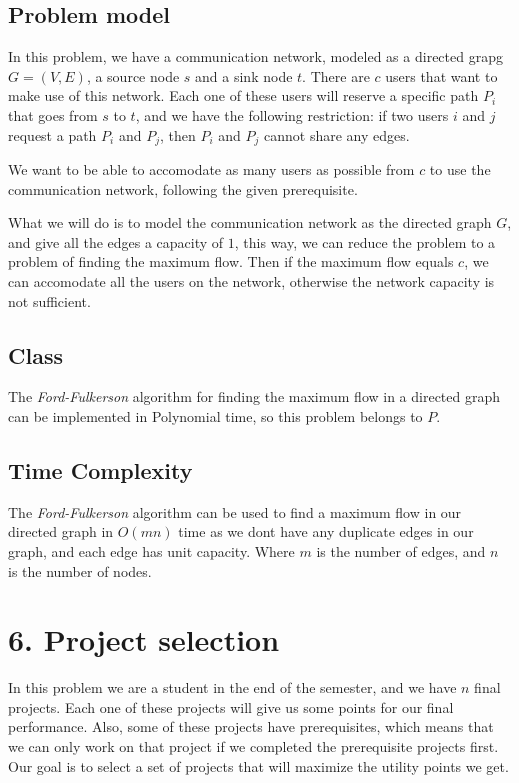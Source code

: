 \documentclass{article}
\begin{document}
\subsection*{Problem model}

In this problem, we have a communication network, modeled as a directed grapg $G = (V,E)$, a source node $s$ and a sink node $t$. There are $c$ users that want to make use of this network. Each one of these users will reserve a specific path $P_i$ that goes from $s$ to $t$, and we have the following restriction: if two users $i$ and $j$ request a path $P_i$ and $P_j$, then $P_i$ and $P_j$ cannot share any edges.

We want to be able to accomodate as many users as possible from $c$ to use the communication network, following the given prerequisite. 

What we will do is to model the communication network as the directed graph $G$, and give all the edges a capacity of $1$, this way, we can reduce the problem to a problem of finding the maximum flow. Then if the maximum flow equals $c$, we can accomodate all the users on the network, otherwise the network capacity is not sufficient.

\subsection*{Class}

The \textit{Ford-Fulkerson} algorithm for finding the maximum flow in a directed graph can be implemented in Polynomial time, so this problem belongs to $P$.

\subsection*{Time Complexity}

The \textit{Ford-Fulkerson} algorithm can be used to find a maximum flow in our directed graph in $O(mn)$ time as we dont have any duplicate edges in our graph, and each edge has unit capacity. 
Where $m$ is the number of edges, and $n$ is the number of nodes.

\section*{6. Project selection}

In this problem we are a student in the end of the semester, and we have $n$ final projects. Each one of these projects will give us some points for our final performance. Also, some of these projects have prerequisites, which means that we can only work on that project if we completed the prerequisite projects first. Our goal is to select a set of projects that will maximize the utility points we get.
\end{document}
